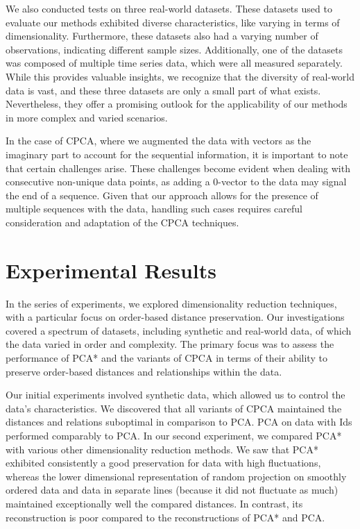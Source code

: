 \documentclass[pdftex,12pt,a4paper]{report}
\begin{document}
We also conducted tests on three real-world datasets.
These datasets used to evaluate our methods exhibited diverse characteristics, like varying in terms of dimensionality.
Furthermore, these datasets also had a varying number of observations, indicating different sample sizes.
Additionally, one of the datasets was composed of multiple time series data, which were all measured separately.
While this provides valuable insights, we recognize that the diversity of real-world data is vast, and these three datasets are only a small part of what exists.
Nevertheless, they offer a promising outlook for the applicability of our methods in more complex and varied scenarios.

In the case of CPCA, where we augmented the data with vectors as the imaginary part to account for the sequential information, it is important to note that certain challenges arise.
These challenges become evident when dealing with consecutive non-unique data points, as adding a 0-vector to the data may signal the end of a sequence.
Given that our approach allows for the presence of multiple sequences with the data, handling such cases requires careful consideration and adaptation of the CPCA techniques.

\section{Experimental Results}
In the series of experiments, we explored dimensionality reduction techniques, with a particular focus on order-based distance preservation.
Our investigations covered a spectrum of datasets, including synthetic and real-world data, of which the data varied in order and complexity.
The primary focus was to assess the performance of PCA* and the variants of CPCA in terms of their ability to preserve order-based distances and relationships within the data.

Our initial experiments involved synthetic data, which allowed us to control the data's characteristics.
We discovered that all variants of CPCA maintained the distances and relations suboptimal in comparison to PCA.
PCA on data with Ids performed comparably to PCA.
In our second experiment, we compared PCA* with various other dimensionality reduction methods.
We saw that PCA* exhibited consistently a good preservation for data with high fluctuations, whereas the lower dimensional representation of random projection on smoothly ordered data and data in separate lines (because it did not fluctuate as much) maintained exceptionally well the compared distances.
In contrast, its reconstruction is poor compared to the reconstructions of PCA* and PCA.
\end{document}
